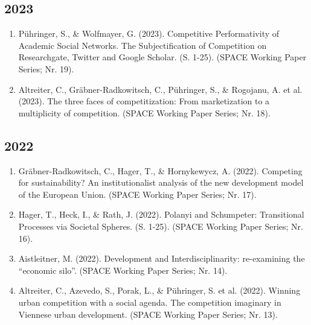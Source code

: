 \subsection*{2023}
\begin{enumerate}
	 \item Pühringer, S., \& Wolfmayer, G. (2023). Competitive Performativity of Academic Social Networks. The Subjectification of Competition on Researchgate, Twitter and Google Scholar. (S. 1-25). (SPACE Working Paper Series; Nr. 19).
	 \item Altreiter, C., Gräbner-Radkowitsch, C., Pühringer, S., \& Rogojanu, A. et al. (2023). The three faces of competitization: From marketization to a multiplicity of competition. (SPACE Working Paper Series; Nr. 18).
\end{enumerate}
\subsection*{2022}
\begin{enumerate}
	 \item Gräbner-Radkowitsch, C., Hager, T., \& Hornykewycz, A. (2022). Competing for sustainability? An institutionalist analysis of the new development model of the European Union. (SPACE Working Paper Series; Nr. 17).
	 \item Hager, T., Heck, I., \& Rath, J. (2022). Polanyi and Schumpeter: Transitional Processes via Societal Spheres. (S. 1-25). (SPACE Working Paper Series; Nr. 16).
	 \item Aistleitner, M. (2022). Development and Interdisciplinarity: re-examining the “economic silo”. (SPACE Working Paper Series; Nr. 14).
	 \item Altreiter, C., Azevedo, S., Porak, L., \& Pühringer, S. et al. (2022). Winning urban competition with a social agenda. The competition imaginary in Viennese urban development. (SPACE Working Paper Series; Nr. 13).
\end{enumerate}
